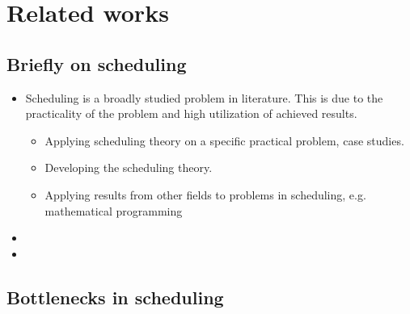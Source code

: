 \chapter{Related works} \label{chap:related-works}

\section*{Briefly on scheduling} \label{sec:related-works/briefly-on-scheduling}

\begin{itemize}
    \item Scheduling is a broadly studied problem in literature. This is due to the practicality
        of the problem and high utilization of achieved results.
    \begin{itemize}
        \item Applying scheduling theory on a specific practical problem, case studies.
        \item Developing the scheduling theory.
        \item Applying results from other fields to problems in scheduling, e.g. mathematical programming
            \citep{KNOP2018}
    \end{itemize}

    \item \todo{}

    \item {}

\end{itemize}
    
\section*{Bottlenecks in scheduling} \label{sec:related-works/bottlenecks-in-scheduling}


